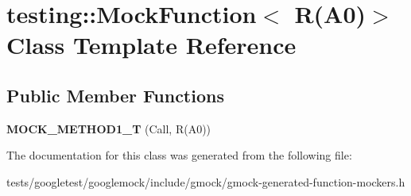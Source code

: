 \hypertarget{classtesting_1_1MockFunction_3_01R_07A0_08_4}{}\section{testing\+:\+:Mock\+Function$<$ R(A0)$>$ Class Template Reference}
\label{classtesting_1_1MockFunction_3_01R_07A0_08_4}
\subsection*{Public Member Functions}
\begin{DoxyCompactItemize}
\item 
\mbox{\label{classtesting_1_1MockFunction_3_01R_07A0_08_4_a6a22e7e14b53d2df30bef4404b41fade}} 
{\bfseries M\+O\+C\+K\+\_\+\+M\+E\+T\+H\+O\+D1\+\_\+T} (Call, R(A0))
\end{DoxyCompactItemize}


The documentation for this class was generated from the following file\+:\begin{DoxyCompactItemize}
\item 
tests/googletest/googlemock/include/gmock/gmock-\/generated-\/function-\/mockers.\+h\end{DoxyCompactItemize}
